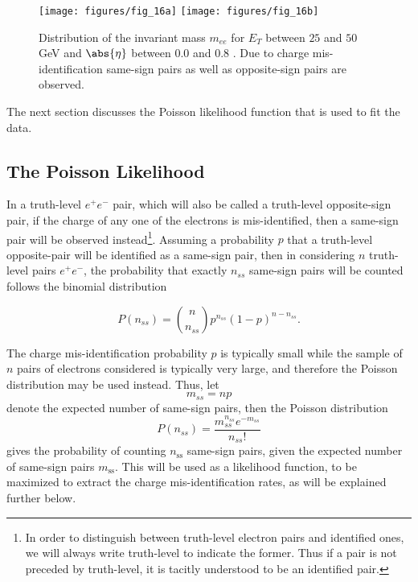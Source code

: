\begin{figure}[H]
	\texttt{[image: figures/fig\_16a]}
	\texttt{[image: figures/fig\_16b]}
	\centering

	\caption{Distribution of the invariant mass $m_{ee}$ for $E_T$ between $25$
		and $50$ GeV and $\abs{\eta} $ between $0.0$ and $0.8$ \cite{atlaselcid}. Due
		to charge mis-identification same-sign pairs as well as opposite-sign pairs
		are observed.}

	\label{f:meea}

\end{figure}

The next section discusses the Poisson likelihood function that is used to
fit the data.


\subsection{The Poisson Likelihood}\label{s:cpllh}

In a truth-level $e^+e^-$ pair, which will also be called a truth-level
opposite-sign pair, if the charge of any one of the electrons is
mis-identified, then a same-sign pair will be observed instead\footnote{ In
	order to distinguish between truth-level electron pairs and identified ones, we
	will always write truth-level to indicate the former. Thus if a pair is not
	preceded by truth-level, it is tacitly understood to be an identified pair. }.
Assuming a probability $p$ that a truth-level opposite-pair will be identified
as a same-sign pair, then in considering $n$ truth-level pairs $e^+e^-$, the
probability that exactly $n_{ss}$ same-sign pairs will be counted follows the
binomial distribution

$$
	P(n_{ss}) = \binom{n}{n_{ss}}p^{n_{ss}}(1-p)^{n-n_{ss}}.
$$

The charge mis-identification probability $p$ is typically small while the
sample of $n$ pairs of electrons considered is typically very large, and
therefore the Poisson distribution may be used instead. Thus, let
\begin{equation}\label{eq:cmss}
	m_{ss} = np
\end{equation}
denote the expected number of same-sign pairs, then the Poisson distribution
\begin{equation}\label{eq:cpoissonn}
	P(n_{ss}) = \frac{m_{ss}^{n_{ss}} e^{-m_{ss}}}{n_{ss}!}
\end{equation}
gives the probability of counting $n_{\text{ss}}$ same-sign pairs, given the
expected number of same-sign pairs $m_{\text{ss}}$. This will be used as
a likelihood function, to be maximized to extract the charge mis-identification
rates, as will be explained further below.

